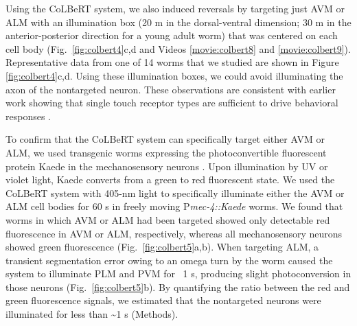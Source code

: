\afterpage{\clearpage}

Using the CoLBeRT system, we also induced reversals by targeting just AVM or ALM with an illumination box (20 \textmu m in the dorsal-ventral dimension; 30 \textmu m in the anterior-posterior direction for a young adult worm) that was centered on each cell body (Fig.~\ref{fig:colbert4}c,d and Videos \ref{movie:colbert8} and \ref{movie:colbert9}). Representative data from one of 14 worms that we studied are shown in Figure \ref{fig:colbert4}c,d. Using these illumination boxes, we could avoid illuminating the axon of the nontargeted neuron. These observations are consistent with earlier work showing that single touch receptor types are sufficient to drive behavioral responses \citep{chalfie_developmental_1981}.

To confirm that the CoLBeRT system can specifically target either AVM or ALM, we used transgenic worms expressing the photoconvertible fluorescent protein Kaede in the mechanosensory neurons \citep{ando_optical_2002}. Upon illumination by UV or violet light, Kaede converts from a green to red fluorescent state. We used the CoLBeRT  system with 405-nm light to specifically illuminate either the AVM or ALM cell bodies for 60 s in freely moving P\textit{mec-4::Kaede} worms. We found that worms in which AVM or ALM had been targeted showed only detectable red fluorescence in AVM or ALM, respectively, whereas all mechanosensory neurons showed green fluorescence (Fig.~\ref{fig:colbert5}a,b). When targeting ALM, a transient segmentation error owing to an omega turn by the worm caused the system to illuminate PLM and PVM for ~1 s, producing slight photoconversion in those neurons (Fig.~\ref{fig:colbert5}b). By quantifying the ratio between the red and green fluorescence signals, we estimated that the nontargeted neurons were illuminated for less than \textasciitilde1 s (Methods).

